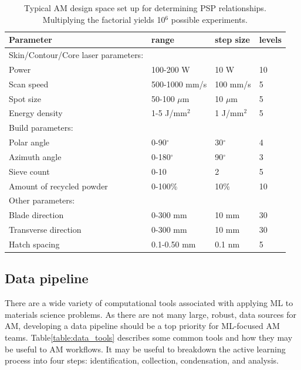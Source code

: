 \begin{table}
    \renewcommand{\arraystretch}{0.8}
    \setlength{\tabcolsep}{5pt}
    \begin{center}
        \begin{tabular}{@{}llll@{}}
            \toprule
            \hline
             Parameter & range & step size & levels \\ \midrule
            \hline
            \hline
            Skin/Contour/Core laser parameters: & & & \\
            Power & 100-200 W & 10 W & 10 \\
            Scan speed & 500-1000 mm/s & 100 mm/s & 5 \\
            Spot size & 50-100 $\mu$m & 10 $\mu$m & 5 \\
            Energy density & 1-5 J/mm$^2$ & 1 J/mm$^2$ & 5 \\
            \hline
            Build parameters: & & & \\
            Polar angle & 0-90$^\circ$ & 30$^\circ$  & 4 \\
            Azimuth angle & 0-180$^\circ$ & 90$^\circ$  & 3 \\
            Sieve count & 0-10 & 2 & 5 \\
            Amount of recycled powder & 0-100\% & 10\% & 10 \\
            \hline
            Other parameters: & & & \\
            Blade direction & 0-300 mm & 10 mm  & 30 \\
            Transverse direction & 0-300 mm & 10 mm  & 30 \\
            Hatch spacing & 0.1-0.50 mm & 0.1 nm  & 5 \\
            \hline
            \bottomrule
        \end{tabular}
        \caption{Typical AM design space set up for determining PSP relationships. Multiplying the factorial yields 10$^6$ possible experiments.}
        \label{table:design_space}
    \end{center}
\end{table}

\subsection{Data pipeline}
\label{subsec:DMC_data}
There are a wide variety of computational tools associated with applying ML to materials science problems.
As there are not many large, robust, data sources for AM, developing a data pipeline should be a top priority for ML-focused AM teams.
Table\ref{table:data_tools} describes some common tools and how they may be useful to AM workflows.
It may be useful to breakdown the active learning process into four steps: identification, collection, condensation, and analysis.

